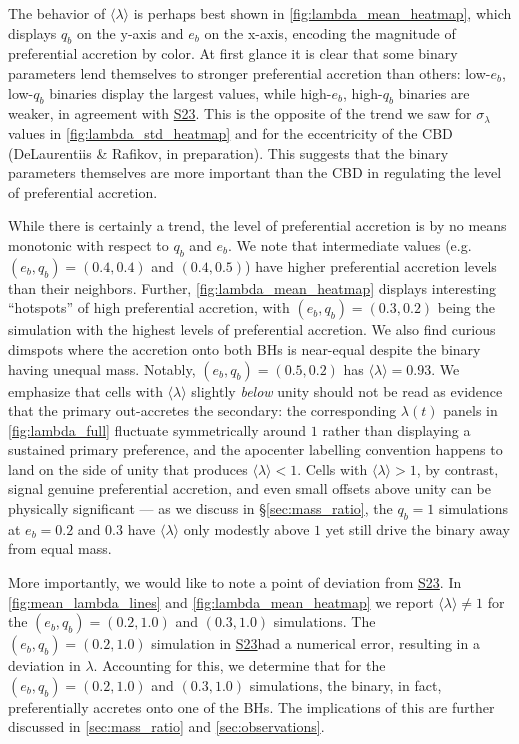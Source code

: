 \documentclass[fleqn,usenatbib]{mnras}
\newcommand{\Stwentythree}{\href{https://doi.org/10.1093/mnras/stac3263}{S23}}
\begin{document}
The behavior of $\langle \lambda \rangle$ is perhaps best shown in \autoref{fig:lambda_mean_heatmap}, which displays $q_b$ on the y-axis and $e_b$ on the x-axis, encoding the magnitude of preferential accretion by color. At first glance it is clear that some binary parameters lend themselves to stronger preferential accretion than others: low-$e_b$, low-$q_b$ binaries display the largest values, while high-$e_b$, high-$q_b$ binaries are weaker, in agreement with \Stwentythree. This is the opposite of the trend we saw for $\sigma_{\lambda}$ values in \autoref{fig:lambda_std_heatmap} and for the eccentricity of the CBD (DeLaurentiis \& Rafikov, in preparation). This suggests that the binary parameters themselves are more important than the CBD in regulating the level of preferential accretion.


While there is certainly a trend, the level of preferential accretion is by no means monotonic with respect to $q_b$ and $e_b$. We note that intermediate values (e.g.\ $(e_b, q_b) = (0.4, 0.4)$ and $(0.4, 0.5)$) have higher preferential accretion levels than their neighbors. Further, \autoref{fig:lambda_mean_heatmap} displays interesting ``hotspots'' of high preferential accretion, with $(e_b, q_b) = (0.3, 0.2)$ being the simulation with the highest levels of preferential accretion. We also find curious dimspots where the accretion onto both BHs is near-equal despite the binary having unequal mass. Notably, $(e_b, q_b) = (0.5, 0.2)$ has $\langle \lambda \rangle = 0.93$. We emphasize that cells with $\langle\lambda\rangle$ slightly \emph{below} unity should not be read as evidence that the primary out-accretes the secondary: the corresponding $\lambda(t)$ panels in \autoref{fig:lambda_full} fluctuate symmetrically around $1$ rather than displaying a sustained primary preference, and the apocenter labelling convention happens to land on the side of unity that produces $\langle\lambda\rangle < 1$. Cells with $\langle\lambda\rangle > 1$, by contrast, signal genuine preferential accretion, and even small offsets above unity can be physically significant --- as we discuss in \S\ref{sec:mass_ratio}, the $q_b = 1$ simulations at $e_b = 0.2$ and $0.3$ have $\langle\lambda\rangle$ only modestly above $1$ yet still drive the binary away from equal mass.

More importantly, we would like to note a point of deviation from \Stwentythree. In \autoref{fig:mean_lambda_lines} and \autoref{fig:lambda_mean_heatmap} we report $\langle \lambda \rangle \neq 1$ for the $(e_b, q_b) = (0.2, 1.0)$ and $(0.3, 1.0)$ simulations. The $(e_b, q_b) = (0.2, 1.0)$ simulation in \Stwentythree had a numerical error, resulting in a deviation in $\lambda$. Accounting for this, we determine that for the $(e_b, q_b) = (0.2, 1.0)$ and $(0.3, 1.0)$ simulations, the binary, in fact, preferentially accretes onto one of the BHs. The implications of this are further discussed in \autoref{sec:mass_ratio} and \autoref{sec:observations}.
\end{document}
